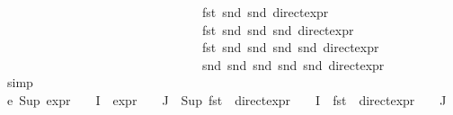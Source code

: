 \begin{isabellebody}
\ \ \ \ \ \ \ \ \ \ \ \ \ \ \ \ \ \ \ \ \ \ \ \ \ \ \ \ \ \ \ \ fst\ {\isacharparenleft}{\kern0pt}snd\ {\isacharparenleft}{\kern0pt}snd\ {\isacharparenleft}{\kern0pt}direct{\isacharunderscore}{\kern0pt}expr\ {\isasymphi}{\isacharparenright}{\kern0pt}{\isacharparenright}{\kern0pt}{\isacharparenright}{\kern0pt}{\isacharcomma}{\kern0pt}\ \isanewline
\ \ \ \ \ \ \ \ \ \ \ \ \ \ \ \ \ \ \ \ \ \ \ \ \ \ \ \ \ \ \ \ fst\ {\isacharparenleft}{\kern0pt}snd\ {\isacharparenleft}{\kern0pt}snd\ {\isacharparenleft}{\kern0pt}snd\ {\isacharparenleft}{\kern0pt}direct{\isacharunderscore}{\kern0pt}expr\ {\isasymphi}{\isacharparenright}{\kern0pt}{\isacharparenright}{\kern0pt}{\isacharparenright}{\kern0pt}{\isacharparenright}{\kern0pt}{\isacharcomma}{\kern0pt}\ \isanewline
\ \ \ \ \ \ \ \ \ \ \ \ \ \ \ \ \ \ \ \ \ \ \ \ \ \ \ \ \ \ \ \ fst\ {\isacharparenleft}{\kern0pt}snd\ {\isacharparenleft}{\kern0pt}snd\ {\isacharparenleft}{\kern0pt}snd\ {\isacharparenleft}{\kern0pt}snd\ {\isacharparenleft}{\kern0pt}direct{\isacharunderscore}{\kern0pt}expr\ {\isasymphi}{\isacharparenright}{\kern0pt}{\isacharparenright}{\kern0pt}{\isacharparenright}{\kern0pt}{\isacharparenright}{\kern0pt}{\isacharparenright}{\kern0pt}{\isacharcomma}{\kern0pt}\ \isanewline
\ \ \ \ \ \ \ \ \ \ \ \ \ \ \ \ \ \ \ \ \ \ \ \ \ \ \ \ \ \ \ \ snd\ {\isacharparenleft}{\kern0pt}snd\ {\isacharparenleft}{\kern0pt}snd\ {\isacharparenleft}{\kern0pt}snd\ {\isacharparenleft}{\kern0pt}snd\ {\isacharparenleft}{\kern0pt}direct{\isacharunderscore}{\kern0pt}expr\ {\isasymphi}{\isacharparenright}{\kern0pt}{\isacharparenright}{\kern0pt}{\isacharparenright}{\kern0pt}{\isacharparenright}{\kern0pt}{\isacharparenright}{\kern0pt}{\isacharparenright}{\kern0pt}{\isachardoublequoteclose}\isanewline
\ \ \ \ \isamarkupfalse%
\ simp{\isacharplus}{\kern0pt}\isanewline
\ \ \isamarkupfalse%
\ e{}{\isacharcolon}{\kern0pt}\ {\isachardoublequoteopen}Sup\ {\isacharparenleft}{\kern0pt}{\isacharparenleft}{\kern0pt}expr{\isacharunderscore}{\kern0pt}{}\ {\isasymcirc}\ {\isasymPhi}{\isacharparenright}{\kern0pt}\ {\isacharbackquote}{\kern0pt}\ I\ {\isasymunion}\ {\isacharparenleft}{\kern0pt}expr{\isacharunderscore}{\kern0pt}{}\ {\isasymcirc}\ {\isasymPhi}{\isacharparenright}{\kern0pt}\ {\isacharbackquote}{\kern0pt}\ J{\isacharparenright}{\kern0pt}\ {\isacharequal}{\kern0pt}\ Sup\ {\isacharparenleft}{\kern0pt}{\isacharparenleft}{\kern0pt}fst\ {\isasymcirc}\ direct{\isacharunderscore}{\kern0pt}expr\ {\isasymcirc}\ {\isasymPhi}{\isacharparenright}{\kern0pt}\ {\isacharbackquote}{\kern0pt}\ I\ {\isasymunion}\ {\isacharparenleft}{\kern0pt}fst\ {\isasymcirc}\ direct{\isacharunderscore}{\kern0pt}expr\ {\isasymcirc}\ {\isasymPhi}{\isacharparenright}{\kern0pt}\ {\isacharbackquote}{\kern0pt}\ J{\isacharparenright}{\kern0pt}{\isachardoublequoteclose}\isanewline

\end{isabellebody}
